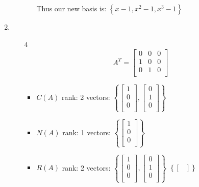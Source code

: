 \documentclass[12pt,letterpaper]{article}
\begin{document}
\begin{enumerate}[label=\S 2.\arabic*]
\begin{enumerate}
\begin{itemize}
              Thus our new basis is:
              $\left\{x - 1, x^2 - 1, x^3 - 1\right\}$
          \end{itemize}
      \end{enumerate}
    \item
      \begin{enumerate}
        \item [4]
          \[
            A^T
            =
            \begin{bmatrix}
              0 & 0 & 0 \\
              1 & 0 & 0 \\
              0 & 1 & 0 \\
            \end{bmatrix}
          \]
          \begin{itemize}
            \item $C(A)$
              rank: 2
              vectors:
              $\left\{\begin{bmatrix}1 \\ 0 \\ 0 \\\end{bmatrix}, \begin{bmatrix}0 \\ 1 \\ 0 \\\end{bmatrix}\right\}$
            \item $N(A)$
              rank: 1
              vectors:
              $\left\{\begin{bmatrix}1 \\ 0 \\ 0 \\\end{bmatrix}\right\}$
            \item $R(A)$
              rank: 2
              vectors:
              $\left\{\begin{bmatrix}1 \\ 0 \\ 0 \\\end{bmatrix}, \begin{bmatrix}0 \\ 1 \\ 0 \\\end{bmatrix}\right\}$
              $\left\{\begin{bmatrix}\end{bmatrix}\right\}$

\end{itemize}
\end{enumerate}
\end{enumerate}
\end{document}
